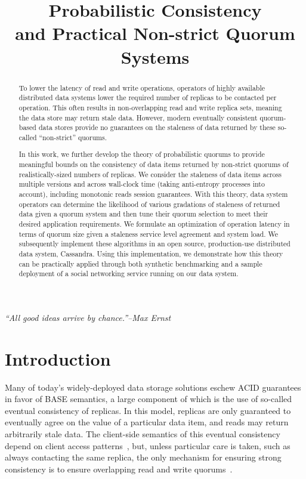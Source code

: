 \documentclass{vldb}
\title{Probabilistic Consistency\\and Practical Non-strict Quorum Systems}
\begin{document}
\maketitle

\noindent\textit{``All good ideas arrive by chance.''--Max Ernst}

\begin{abstract}


To lower the latency of read and write operations, operators of highly
available distributed data systems lower the required number of replicas
to be contacted per operation. This often results in non-overlapping
read and write replica sets, meaning the data store may return stale
data. However, modern eventually consistent quorum-based data stores
provide no guarantees on the staleness of data returned by these
so-called “non-strict” quorums.

In this work, we further develop the theory of probabilistic quorums
to provide meaningful bounds on the consistency of data items returned
by non-strict quorums of realistically-sized numbers of replicas. We
consider the staleness of data items across multiple versions and
across wall-clock time (taking anti-entropy processes into account),
including monotonic reads session guarantees. With this theory,
data system operators can determine the likelihood of various gradations
of staleness of returned data given a quorum system and then tune
their quorum selection to meet their desired application requirements.
We formulate an optimization of operation latency in terms of quorum
size given a staleness service level agreement and system load. We
subsequently implement these algorithms in an open source,
production-use distributed data system, Cassandra. Using this
implementation, we demonstrate how this theory can be practically
applied through both synthetic benchmarking and a sample deployment of
a social networking service running on our data system.

\end{abstract}

\section{Introduction}


Many of today's widely-deployed data storage solutions eschew ACID
guarantees in favor of BASE semantics, a large component of which is
the use of so-called eventual consistency of replicas.  In this model,
replicas are only guaranteed to eventually agree on the value of a
particular data item, and reads may return arbitrarily stale data.
The client-side semantics of this eventual consistency depend on
client access patterns~\cite{vogels-defs}, but, unless particular care
is taken, such as always contacting the same replica, the only
mechanism for ensuring strong consistency is to ensure overlapping
read and write quorums~\cite{dynamo}.
\end{document}
